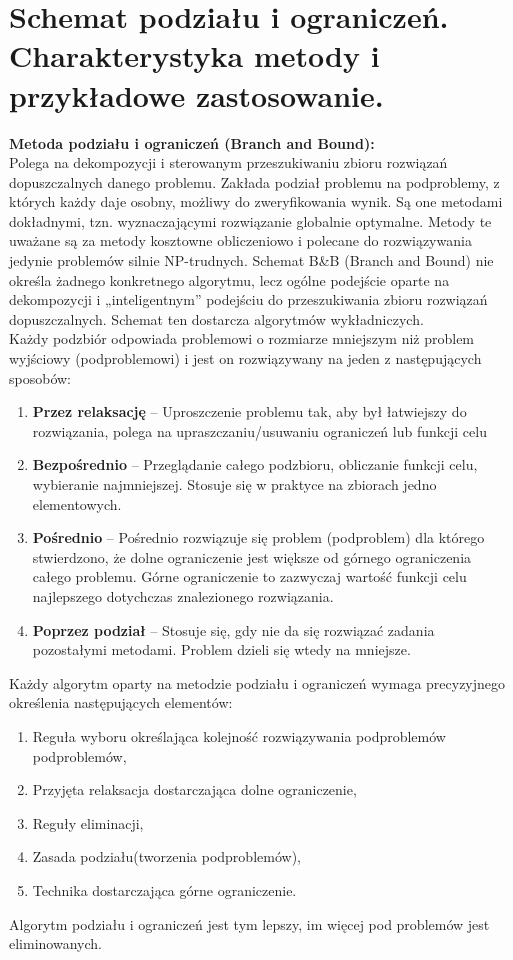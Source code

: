 \documentclass[10pt, a
4paper]{article}
\begin{document}
\newpage
\section{Schemat podziału i ograniczeń. Charakterystyka metody i przykładowe zastosowanie.}
\noindent \textbf{Metoda podziału i ograniczeń (Branch and Bound):}\\
\indent Polega na dekompozycji i sterowanym przeszukiwaniu zbioru rozwiązań dopuszczalnych danego problemu. Zakłada podział problemu na podproblemy, z których każdy daje osobny, możliwy do zweryfikowania wynik. Są one metodami dokładnymi, tzn. wyznaczającymi rozwiązanie globalnie optymalne. Metody te uważane są za metody kosztowne obliczeniowo i polecane do rozwiązywania jedynie problemów silnie NP-trudnych. Schemat B\&B (Branch and Bound) nie określa żadnego konkretnego algorytmu, lecz ogólne podejście oparte na dekompozycji i „inteligentnym” podejściu do przeszukiwania zbioru rozwiązań dopuszczalnych. Schemat ten dostarcza algorytmów wykładniczych.\\

\noindent Każdy podzbiór odpowiada problemowi o rozmiarze mniejszym niż problem wyjściowy (podproblemowi) i jest on rozwiązywany na jeden z następujących sposobów:
\begin{enumerate}
\item \textbf{Przez relaksację} -- Uproszczenie problemu tak, aby był łatwiejszy do rozwiązania, polega na upraszczaniu/usuwaniu ograniczeń lub funkcji celu
\item \textbf{Bezpośrednio} -- Przeglądanie całego podzbioru, obliczanie funkcji celu, wybieranie najmniejszej. Stosuje się w praktyce na zbiorach jedno elementowych.
\item \textbf{Pośrednio} --  Pośrednio rozwiązuje się problem (podproblem) dla którego stwierdzono, że dolne ograniczenie jest większe od górnego ograniczenia całego problemu. Górne ograniczenie to zazwyczaj wartość funkcji celu najlepszego dotychczas znalezionego rozwiązania.
\item \textbf{Poprzez podział} -- Stosuje się, gdy nie da się rozwiązać zadania pozostałymi metodami. Problem dzieli się wtedy na mniejsze.
\end{enumerate}
Każdy algorytm oparty na metodzie podziału i ograniczeń wymaga precyzyjnego określenia następujących elementów:
\begin{enumerate}
\item Reguła wyboru określająca kolejność rozwiązywania podproblemów
podproblemów,
\item Przyjęta relaksacja dostarczająca dolne ograniczenie,
\item Reguły eliminacji,
\item Zasada podziału(tworzenia podproblemów),
\item Technika dostarczająca górne ograniczenie.
\end{enumerate}
Algorytm podziału i ograniczeń jest tym lepszy, im więcej pod problemów jest eliminowanych.
\end{document}
